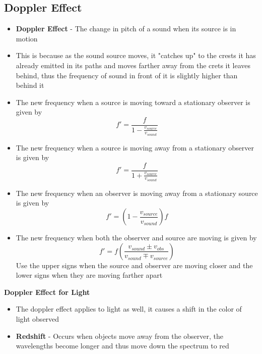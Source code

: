 \subsection{Doppler Effect}
\begin{itemize}
    \item \textbf{Doppler Effect} - The change in pitch of a sound when its source is in motion
    \item This is because as the sound source moves, it "catches up" to the crests it has already emitted in its paths and moves farther away from the crets it leaves behind, thus the frequency of sound in front of it is slightly higher than behind it
    \item The new frequency when a source is moving toward a stationary observer is given by \[f'=\frac{f}{1-\frac{v_{source}}{v_{sound}}}\]
    \item The new frequency when a source is moving away from a stationary observer is given by \[f'=\frac{f}{1+\frac{v_{source}}{v_{sound}}}\]
    \item The new frequency when an observer is moving away from a stationary source is given by \[f'=(1-\frac{v_{source}}{v_{sound}})f\]
    \item The new frequency when both the observer and source are moving is given by \[f'=f(\frac{v_{sound}\pm v_{obs}}{v_{sound}\mp v_{source}})\] Use the upper signs when the source and observer are moving closer and the lower signs when they are moving farther apart
\end{itemize}

\textbf{Doppler Effect for Light}
\begin{itemize}
    \item The doppler effect applies to light as well, it causes a shift in the color of light observed
    \item \textbf{Redshift} - Occurs when objects move away from the observer, the wavelengths become longer and thus move down the spectrum to red
\end{itemize}

